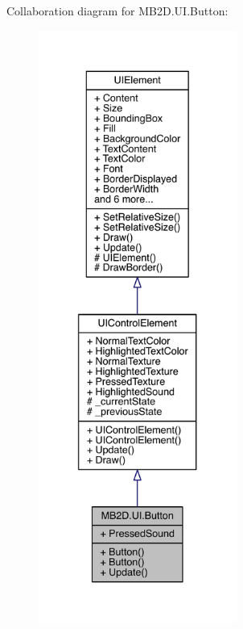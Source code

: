 Collaboration diagram for M\+B2\+D.\+U\+I.\+Button\+:
\nopagebreak
\begin{figure}[H]
\begin{center}
\leavevmode
\includegraphics[height=550pt]{class_m_b2_d_1_1_u_i_1_1_button__coll__graph}
\end{center}
\end{figure}
